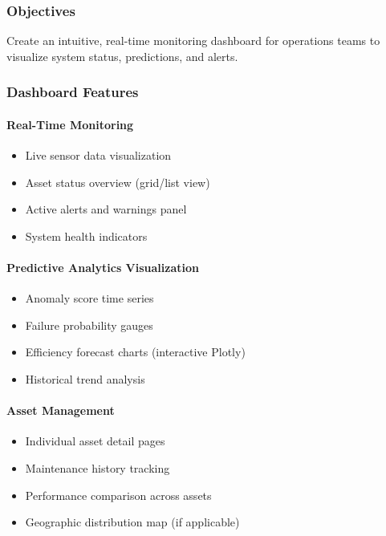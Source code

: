 \documentclass[12pt,a4paper]{article}
\begin{document}
\subsubsection{Objectives}
Create an intuitive, real-time monitoring dashboard for operations teams to visualize system status, predictions, and alerts.

\subsubsection{Dashboard Features}

\paragraph{Real-Time Monitoring}
\begin{itemize}[leftmargin=*]
    \item Live sensor data visualization
    \item Asset status overview (grid/list view)
    \item Active alerts and warnings panel
    \item System health indicators
\end{itemize}

\paragraph{Predictive Analytics Visualization}
\begin{itemize}[leftmargin=*]
    \item Anomaly score time series
    \item Failure probability gauges
    \item Efficiency forecast charts (interactive Plotly)
    \item Historical trend analysis
\end{itemize}

\paragraph{Asset Management}
\begin{itemize}[leftmargin=*]
    \item Individual asset detail pages
    \item Maintenance history tracking
    \item Performance comparison across assets
    \item Geographic distribution map (if applicable)
\end{itemize}
\end{document}
